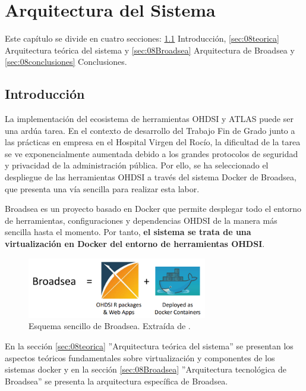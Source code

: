 \chapter{Arquitectura del Sistema}\label{cap:08arquitectura}

Este capítulo se divide en cuatro secciones: \ref{sec:08intro} Introducción, \ref{sec:08teorica} Arquitectura teórica del sistema y \ref{sec:08Broadsea} Arquitectura de Broadsea y \ref{sec:08conclusiones} Conclusiones.

\section{Introducción} \label{sec:08intro}

La implementación del ecosistema de herramientas OHDSI y ATLAS puede ser una ardúa tarea. En el contexto de desarrollo del Trabajo Fin de Grado junto a las prácticas en empresa en el Hospital Virgen del Rocío, la dificultad de la tarea se ve exponencialmente aumentada debido a los grandes protocolos de seguridad y privacidad de la administración pública. Por ello, se ha seleccionado el despliegue de las herramientas OHDSI a través del sistema Docker de Broadsea, que presenta una vía sencilla para realizar esta labor. 

Broadsea es un proyecto basado en Docker que permite desplegar todo el entorno de herramientas, configuraciones y dependencias OHDSI de la manera más sencilla hasta el momento. Por tanto, \textbf{el sistema se trata de una virtualización en Docker del entorno de herramientas OHDSI}.

\begin{figure}[H]
    \centering
    \includegraphics[width=0.70\textwidth]{figures/broadseaEq.png}
    \caption{Esquema sencillo de Broadsea. Extraída de \cite{Broadsea3PPTX}.}
    \label{fig:broadseaEq}
\end{figure}

En la sección \ref{sec:08teorica} ''Arquitectura teórica del sistema'' se presentan los aspectos teóricos fundamentales sobre virtualización y componentes de los sistemas docker y en la sección \ref{sec:08Broadsea} ''Arquitectura tecnológica de Broadsea'' se presenta la arquitectura específica de Broadsea.

